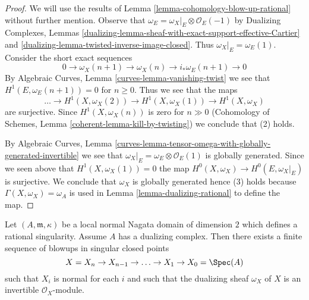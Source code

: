 \begin{proof}
We will use the results of Lemma \ref{lemma-cohomology-blow-up-rational}
without further mention. Observe that
$\omega_E = \omega_X|_E \otimes \mathcal{O}_E(-1)$
by Dualizing Complexes, Lemmas
\ref{dualizing-lemma-sheaf-with-exact-support-effective-Cartier} and
\ref{dualizing-lemma-twisted-inverse-image-closed}. Thus
$\omega_X|_E = \omega_E(1)$. Consider the short exact sequences
$$
0 \to \omega_X(n + 1) \to \omega_X(n) \to i_*\omega_E(n + 1) \to 0
$$
By Algebraic Curves, Lemma \ref{curves-lemma-vanishing-twist}
we see that $H^1(E, \omega_E(n + 1)) = 0$ for $n \geq 0$.
Thus we see that the maps
$$
\ldots \to H^1(X, \omega_X(2)) \to H^1(X, \omega_X(1)) \to H^1(X, \omega_X)
$$
are surjective. Since $H^1(X, \omega_X(n))$ is zero for $n \gg 0$
(Cohomology of Schemes, Lemma \ref{coherent-lemma-kill-by-twisting})
we conclude that (2) holds.

\medskip\noindent
By Algebraic Curves, Lemma
\ref{curves-lemma-tensor-omega-with-globally-generated-invertible}
we see that $\omega_X|_E = \omega_E \otimes \mathcal{O}_E(1)$
is globally generated. Since we seen above that
$H^1(X, \omega_X(1)) = 0$ the map $H^0(X, \omega_X) \to H^0(E, \omega_X|_E)$
is surjective. We conclude that $\omega_X$ is globally generated
hence (3) holds because $\Gamma(X, \omega_X) = \omega_A$ is used
in Lemma \ref{lemma-dualizing-rational} to define the map.
\end{proof}

\begin{lemma}
\label{lemma-rational-to-gorenstein}
Let $(A, \mathfrak m, \kappa)$ be a local normal Nagata domain of
dimension $2$ which defines a rational singularity. Assume $A$ has
a dualizing complex. Then there exists a finite sequence of blowups in
singular closed points
$$
X = X_n \to X_{n - 1} \to \ldots \to X_1 \to X_0 = \Spec(A)
$$
such that $X_i$ is normal for each $i$ and such that
the dualizing sheaf $\omega_X$ of $X$ is an invertible
$\mathcal{O}_X$-module.
\end{lemma}

